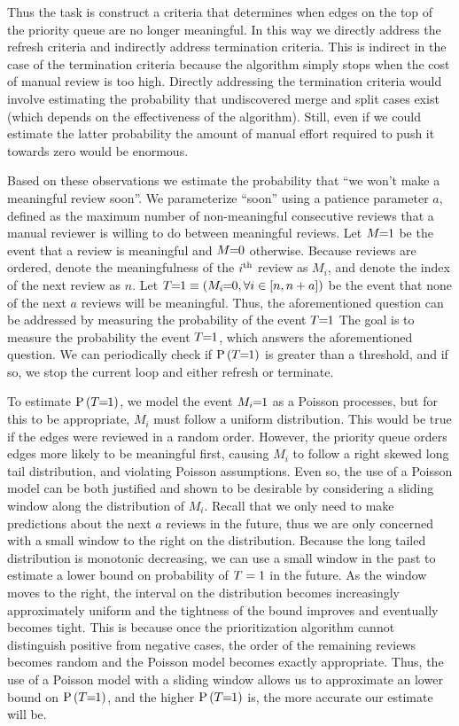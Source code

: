Thus the task is construct a criteria that determines when edges on the top of the priority queue are no longer
  meaningful.
In this way we directly address the refresh criteria and indirectly address termination criteria.
This is indirect in the case of the termination criteria because the algorithm simply stops when the cost of
  manual review is too high.
Directly addressing the termination criteria would involve estimating the probability that undiscovered merge and
  split cases exist (which depends on the effectiveness of the algorithm).
Still, even if we could estimate the latter probability the amount of manual effort required to push it towards
  zero would be enormous.

Based on these observations we estimate the probability that ``we won't make a meaningful review soon''.
We parameterize ``soon'' using a patience parameter $a$, defined as the maximum number of non-meaningful
  consecutive reviews that a manual reviewer is willing to do between meaningful reviews.
Let $M\mkern-6mu=\mkern-6mu1$ be the event that a review is meaningful and $M\mkern-6mu=\mkern-6mu0$ otherwise.
Because reviews are ordered, denote the meaningfulness of the $i^{\textrm{th}}$ review as $M_i$, and denote the index of the
  next review as $n$.
Let $T\mkern-6mu=\mkern-6mu1 \equiv (M_i\mkern-6mu=\mkern-6mu0, \forall i \in [n, n + a])$ be the event that none of the next $a$ reviews will be
  meaningful.
Thus, the aforementioned question can be addressed by measuring the probability of the event $T\mkern-6mu=\mkern-6mu1$ The goal is
  to measure the probability the event $T\mkern-6mu=\mkern-6mu1$, which answers the aforementioned question.
We can periodically check if $\mathbin{\mathbin{\operatorname{P}}}\left(T\mkern-6mu=\mkern-6mu1\right)$ is greater than a threshold, and if so, we stop the current loop and
  either refresh or terminate.

To estimate $\mathbin{\mathbin{\operatorname{P}}}\left(T\mkern-6mu=\mkern-6mu1\right)$, we model the event $M_i\mkern-6mu=\mkern-6mu1$ as a Poisson processes, but for this to be appropriate,
  $M_i$ must follow a uniform distribution.
This would be true if the edges were reviewed in a random order.
However, the priority queue orders edges more likely to be meaningful first, causing $M_i$ to follow a right
  skewed long tail distribution, and violating Poisson assumptions.
Even so, the use of a Poisson model can be both justified and shown to be desirable by considering a sliding
  window along the distribution of $M_i$.
Recall that we only need to make predictions about the next $a$ reviews in the future, thus we are only concerned
  with a small window to the right on the distribution.
Because the long tailed distribution is monotonic decreasing, we can use a small window in the past to estimate a
  lower bound on probability of $T=1$ in the future.
As the window moves to the right, the interval on the distribution becomes increasingly approximately uniform and
  the tightness of the bound improves and eventually becomes tight.
This is because once the prioritization algorithm cannot distinguish positive from negative cases, the order of
  the remaining reviews becomes random and the Poisson model becomes exactly appropriate.
Thus, the use of a Poisson model with a sliding window allows us to approximate an lower bound on $\mathbin{\mathbin{\operatorname{P}}}\left(T\mkern-6mu=\mkern-6mu1\right)$,
  and the higher $\mathbin{\mathbin{\operatorname{P}}}\left(T\mkern-6mu=\mkern-6mu1\right)$ is, the more accurate our estimate will be.



